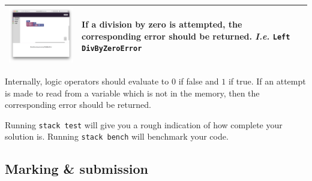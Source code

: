 \documentclass{cs256-shared/cs256}
\begin{document}
\begin{center}
\begin{longtable}[t]{|c|p{5cm}|}
		\includegraphics[align=t,width=250px]{semantics/7-divbyzero.png} &
		If a division by zero is attempted, the corresponding error should be returned. \emph{I.e.} \texttt{Left DivByZeroError} \\ \hline
	\end{longtable}
\end{center}
Internally, logic operators should evaluate to $0$ if false and $1$ if true. If an attempt is made to read from a variable which is not in the memory, then the corresponding error should be returned.

Running \texttt{stack test} will give you a rough indication of how complete your solution is. Running \texttt{stack bench} will benchmark your code.

\subsection*{Marking \& submission}
\end{document}
